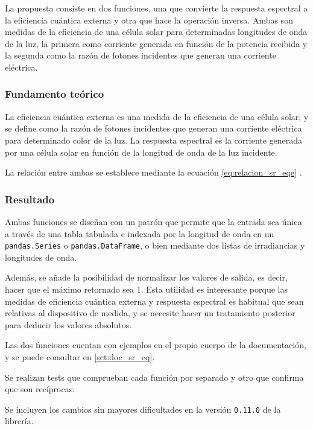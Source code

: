 La propuesta consiste en dos funciones, una que convierte la \gls{respuesta espectral} a la \gls{eficiencia cuántica externa} y otra que hace la operación inversa. Ambas son medidas de la eficiencia de una \gls{célula solar} para determinadas longitudes de onda de la luz, la primera como corriente generada en función de la potencia recibida y la segunda como la razón de fotones incidentes que generan una corriente eléctrica.

\subsubsection{Fundamento teórico}

La eficiencia cuántica externa es una medida de la eficiencia de una célula solar, y se define como la razón de fotones incidentes que generan una corriente eléctrica para determinado color de la luz. La respuesta espectral es la corriente generada por una célula solar en función de la \gls{longitud de onda} de la luz incidente.

La relación entre ambas se establece mediante la ecuación \ref{eq:relacion_sr_eqe} \cite[pp. 15-16, Eq. ]{Markvart2012-un}.

\subsubsection{Resultado}

Ambas funciones se diseñan con un patrón que permite que la entrada sea única a través de una \gls{tabla tabulada e indexada} por la \gls{longitud de onda} en un \texttt{pandas.Series} o \texttt{pandas.DataFrame}, o bien mediante dos listas de irradiancias y longitudes de onda.

Además, se añade la posibilidad de normalizar los valores de salida, es decir, hacer que el máximo retornado sea 1. Esta utilidad es interesante porque las medidas de eficiencia cuántica externa y respuesta espectral es habitual que sean relativas al dispositivo de medida, y se necesite hacer un tratamiento posterior para deducir los valores absolutos.

Las dos funciones cuentan con ejemplos en el propio cuerpo de la documentación, y se puede consultar en \ref{sct:doc_sr_eq}.

Se realizan tests que comprueban cada función por separado y otro que confirma que son recíprocas.

Se incluyen los cambios sin mayores dificultades en la versión \texttt{0.11.0} de la librería.

